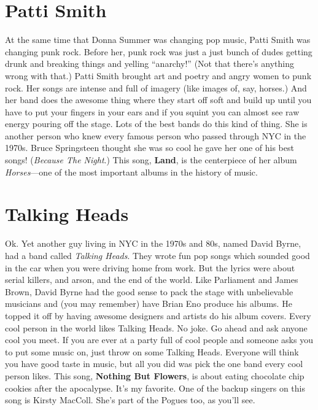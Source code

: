 \documentclass[letterpaper,single]{article}
\begin{document}
\section{Patti Smith}
At the same time that Donna Summer was changing pop music, Patti Smith was changing punk rock. 
Before her, punk rock was just a just bunch of dudes getting drunk and breaking things and yelling ``anarchy!'' (Not that there's anything wrong with that.) 
Patti Smith brought art and poetry and angry women to punk rock. 
Her songs are intense and full of imagery (like images of, say, horses.) 
And her band does the awesome thing where they start off soft and build up until you have to put your fingers in your ears and if you squint you can almost see raw energy pouring off the stage. 
Lots of the best bands do this kind of thing.
She is another person who knew every famous person who passed through NYC in the 1970s. 
Bruce Springsteen thought she was so cool he gave her one of his best songs! (\emph{Because The Night}.) This song, \textbf{Land}, is the centerpiece of her album \emph{Horses}---one of the most important albums in the history of music.

\section{Talking Heads}
Ok. Yet another guy living in NYC in the 1970s and 80s, named David Byrne, had a band called \emph{Talking Heads}. 
They wrote fun pop songs which sounded good in the car when you were driving home from work. 
But the lyrics were about serial killers, and arson, and the end of the world. 
Like Parliament and James Brown, David Byrne had the good sense to pack the stage with unbelievable musicians and (you may remember) have Brian Eno produce his albums. 
He topped it off by having awesome designers and artists do his album covers. 
Every cool person in the world likes Talking Heads. 
No joke. 
Go ahead and ask anyone cool you meet. 
If you are ever at a party full of cool people and someone asks you to put some music on, just throw on some Talking Heads. 
Everyone will think you have good taste in music, but all you did was pick the one band every cool person likes. 
This song, \textbf{Nothing But Flowers}, is about eating chocolate chip cookies after the apocalypse. It's my favorite. 
One of the backup singers on this song is Kirsty MacColl. She's part of the Pogues too, as you'll see.
\end{document}
